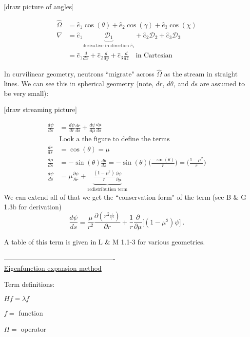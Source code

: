 \documentclass[12pt]{article}
\newcommand{\vOmega}{\ensuremath{\hat{\Omega}}}
\begin{document}
[draw picture of angles]

\begin{align*}
\vOmega &= \hat{e}_1 \cos(\theta) + \hat{e}_2 \cos(\gamma) + \hat{e}_3 \cos(\chi) \\
\nabla &= \hat{e}_1 \underbrace{\mathcal{D}_1}_{\text{derivative in direction }\hat{e}_1} + \hat{e}_2 \mathcal{D}_2 + \hat{e}_3 \mathcal{D}_3\\
&= \hat{e}_1 \frac{d}{dx} + \hat{e}_2 \frac{d}{dy} + \hat{e}_3 \frac{d}{dz} \quad \text{in Cartesian}
\end{align*}

In curvilinear geometry, neutrons ``migrate" across $\vOmega$ as the stream in straight lines. 
We can see this in spherical geometry (note, $dr$, $d\theta$, and $ds$ are assumed to be very small):

[draw streaming picture]

\begin{align*}
\frac{d \psi}{ds} &= \frac{d \psi}{dr} \frac{dr}{ds} + \frac{d\psi}{d\mu} \frac{d\mu}{ds} \\
&\text{Look a the figure to define the terms}\\
\frac{dr}{ds} &= \cos(\theta) = \mu \\
%
\frac{d \mu}{ds} &= -\sin(\theta) \frac{d \theta}{ds} = -\sin(\theta) \biggl(\frac{-\sin(\theta)}{r} \biggr) = \biggl(\frac{1 - \mu^2}{r} \biggr) \\
%
\frac{d\psi}{ds} &= \mu \frac{\partial \psi}{\partial r} + \underbrace{\frac{(1 - \mu^2)}{r}\frac{\partial \psi}{\partial \mu}}_{\text{redistribution term}}
\end{align*}
%
We can extend all of that we get the ``conservation form" of the term (see B \& G 1.3b for derivation)
\[\frac{d\psi}{ds} = \frac{\mu}{r^2} \frac{\partial(r^2 \psi)}{\partial r} + \frac{1}{r} \frac{\partial}{\partial \mu}\bigl[(1 - \mu^2) \psi \bigr] \:. \]

A table of this term is given in L \& M 1.1-3 for various geometries.



-------------------------------------------------\\
\underline{Eigenfunction expansion method}

Term definitions:

$Hf = \lambda f$

$f =$ function

$H =$ operator
\end{document}
